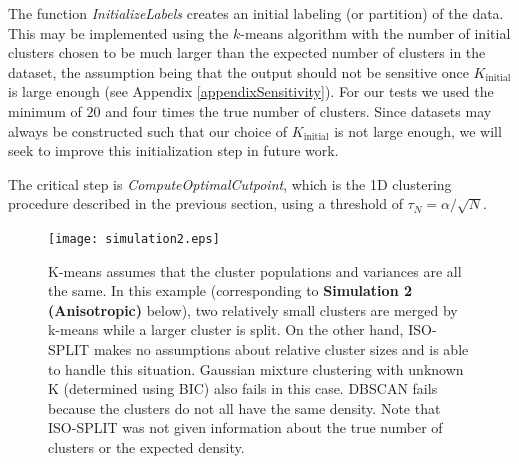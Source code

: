 \documentclass[10pt]{article}
\begin{document}

The function \emph{InitializeLabels} creates an initial labeling (or partition) of the data. This may be implemented using the $k$-means algorithm with the number of initial clusters chosen to be much larger than the expected number of clusters in the dataset, the assumption being that the output should not be sensitive once $K_\text{initial}$ is large enough (see Appendix \ref{appendixSensitivity}). For our tests we used the minimum of $20$ and four times the true number of clusters. Since datasets may always be constructed such that our choice of $K_\text{initial}$ is not large enough, we will seek to improve this initialization step in future work.

The critical step is \emph{ComputeOptimalCutpoint}, which is the 1D clustering procedure described in the previous section, using a threshold of $\tau_N=\alpha/\sqrt{N}$.


\begin{figure}
\begin{center}
\texttt{[image: simulation2.eps]}
\end{center}
\caption{
K-means assumes that the cluster populations and variances are all the same. In this example (corresponding to \textbf{Simulation 2 (Anisotropic)} below), two relatively small clusters are merged by k-means while a larger cluster is split. On the other hand, ISO-SPLIT makes no assumptions about relative cluster sizes and is able to handle this situation. Gaussian mixture clustering with unknown K (determined using BIC) also fails in this case. DBSCAN fails because the clusters do not all have the same density. Note that ISO-SPLIT was not given information about the true number of clusters or the expected density.
}
\label{fig:simulation2}
\end{figure}
\end{document}
